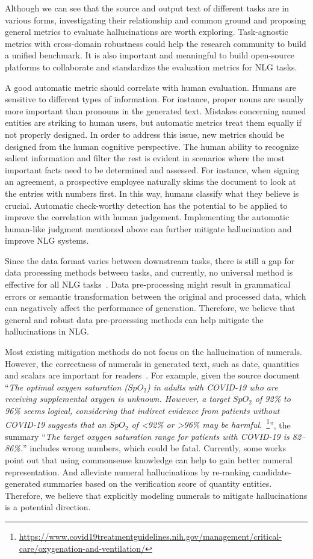 Although we can see that the source and output text of different tasks are in various forms,
investigating their relationship and common ground and proposing general metrics to evaluate hallucinations are worth exploring. Task-agnostic metrics with cross-domain robustness could help the research community to build a unified benchmark.
It is also important and meaningful to build open-source platforms to collaborate and standardize the evaluation metrics for NLG tasks.

A good automatic metric should correlate with human evaluation. 
Humans are sensitive to different types of information. For instance, proper nouns are usually more important than pronouns in the generated text. Mistakes concerning named entities are striking to human users, but automatic metrics treat them equally if not properly designed. In order to address this issue, new metrics should be designed from the human cognitive perspective. 
The human ability to recognize salient information and filter the rest is evident in scenarios where the most important facts need to be determined and assessed. For instance, when signing an agreement, a prospective employee naturally skims the document to look at the entries with numbers first. In this way, humans classify what they believe is crucial. 
Automatic check-worthy detection has the potential to be applied to improve the correlation with human judgement.
Implementing the automatic human-like judgment mentioned above can further mitigate hallucination and improve NLG systems.



Since the data format varies between downstream tasks, there is still a gap for data processing methods between tasks, and currently, no universal method is effective for all NLG tasks~.
Data pre-processing might result in grammatical errors or semantic transformation between the original and processed data, which can negatively affect the performance of generation.
Therefore, we believe that general and robust data pre-processing methods can help mitigate the hallucinations in NLG.

Most existing mitigation methods do not focus on the hallucination of numerals. However, the correctness of numerals in generated text, such as date, quantities and scalars are important for readers~. 
For example, given the source document ``\textit{The optimal oxygen saturation ($SpO_2$) in adults with COVID-19 who are receiving supplemental oxygen is unknown. However, a target $SpO_2$ of 92\% to 96\% seems logical, considering that indirect evidence from patients without COVID-19 suggests that an $SpO_2$ of <92\% or >96\% may be harmful.}~\footnote{\url{https://www.covid19treatmentguidelines.nih.gov/management/critical-care/oxygenation-and-ventilation/}}'', the summary ``\textit{The target oxygen saturation range for patients with COVID-19 is 82–86\%.}'' includes wrong numbers, which could be fatal.
Currently, some works~ point out that using commonsense knowledge can help to gain better numeral representation. And  alleviate numeral hallucinations by re-ranking candidate-generated summaries based on the verification score of quantity entities.
Therefore, we believe that explicitly modeling numerals to mitigate hallucinations is a potential direction.

